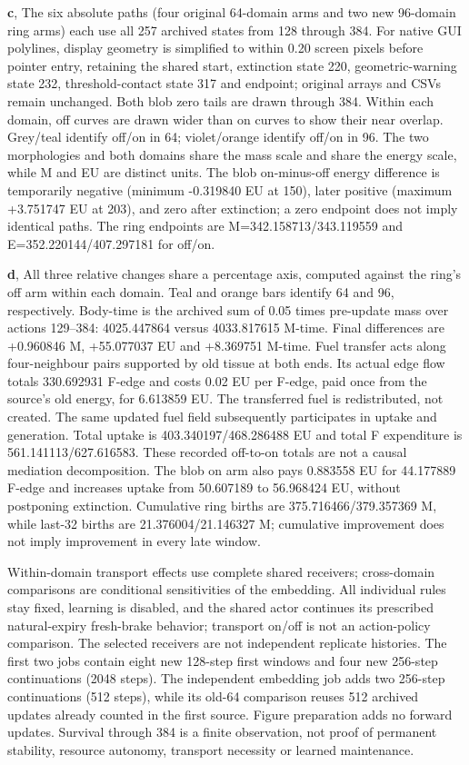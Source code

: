 \textbf{c}, The six absolute paths (four original 64-domain arms and two new 96-domain ring arms) each use all 257 archived states from 128 through 384. For native GUI polylines, display geometry is simplified to within 0.20 screen pixels before pointer entry, retaining the shared start, extinction state 220, geometric-warning state 232, threshold-contact state 317 and endpoint; original arrays and CSVs remain unchanged. Both blob zero tails are drawn through 384. Within each domain, off curves are drawn wider than on curves to show their near overlap. Grey/teal identify off/on in 64; violet/orange identify off/on in 96. The two morphologies and both domains share the mass scale and share the energy scale, while M and EU are distinct units. The blob on-minus-off energy difference is temporarily negative (minimum -0.319840 EU at 150), later positive (maximum +3.751747 EU at 203), and zero after extinction; a zero endpoint does not imply identical paths. The ring endpoints are M=342.158713/343.119559 and E=352.220144/407.297181 for off/on.

\textbf{d}, All three relative changes share a percentage axis, computed against the ring's off arm within each domain. Teal and orange bars identify 64 and 96, respectively. Body-time is the archived sum of 0.05 times pre-update mass over actions 129--384: 4025.447864 versus 4033.817615 M-time. Final differences are +0.960846 M, +55.077037 EU and +8.369751 M-time. Fuel transfer acts along four-neighbour pairs supported by old tissue at both ends. Its actual edge flow totals 330.692931 F-edge and costs 0.02 EU per F-edge, paid once from the source's old energy, for 6.613859 EU. The transferred fuel is redistributed, not created. The same updated fuel field subsequently participates in uptake and generation. Total uptake is 403.340197/468.286488 EU and total F expenditure is 561.141113/627.616583. These recorded off-to-on totals are not a causal mediation decomposition. The blob on arm also pays 0.883558 EU for 44.177889 F-edge and increases uptake from 50.607189 to 56.968424 EU, without postponing extinction. Cumulative ring births are 375.716466/379.357369 M, while last-32 births are 21.376004/21.146327 M; cumulative improvement does not imply improvement in every late window.

Within-domain transport effects use complete shared receivers; cross-domain comparisons are conditional sensitivities of the embedding. All individual rules stay fixed, learning is disabled, and the shared actor continues its prescribed natural-expiry fresh-brake behavior; transport on/off is not an action-policy comparison. The selected receivers are not independent replicate histories. The first two jobs contain eight new 128-step first windows and four new 256-step continuations (2048 steps). The independent embedding job adds two 256-step continuations (512 steps), while its old-64 comparison reuses 512 archived updates already counted in the first source. Figure preparation adds no forward updates. Survival through 384 is a finite observation, not proof of permanent stability, resource autonomy, transport necessity or learned maintenance.



